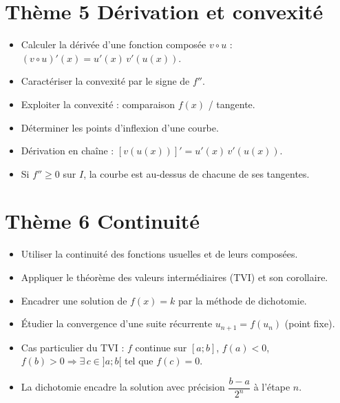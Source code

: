 \documentclass[11pt,a4paper,openany]{book}
\theoremstyle{definition}
\begin{document}
    \section*{Thème 5 \textemdash{} Dérivation et convexité}
    \begin{capacitesbox}
    \begin{itemize}
        \item Calculer la dérivée d'une fonction composée $v\circ u$ :
              $(v\circ u)'(x)=u'(x)\,v'(u(x))$.
        \item Caractériser la convexité par le signe de $f''$.
        \item Exploiter la convexité : comparaison $f(x)$ / tangente.
        \item Déterminer les points d'inflexion d'une courbe.
    \end{itemize}
    \end{capacitesbox}
    \begin{demoprogbox}
    \begin{itemize}
        \item Dérivation en chaîne : $[v(u(x))]'=u'(x)\,v'(u(x))$.
        \item Si $f''\geq 0$ sur $I$, la courbe est au-dessus de chacune de
              ses tangentes.
    \end{itemize}
    \end{demoprogbox}

    \section*{Thème 6 \textemdash{} Continuité}
    \begin{capacitesbox}
    \begin{itemize}
        \item Utiliser la continuité des fonctions usuelles et de leurs
              composées.
        \item Appliquer le théorème des valeurs intermédiaires (TVI) et son
              corollaire.
        \item Encadrer une solution de $f(x)=k$ par la méthode de dichotomie.
        \item Étudier la convergence d'une suite récurrente $u_{n+1}=f(u_n)$
              (point fixe).
    \end{itemize}
    \end{capacitesbox}
    \begin{demoprogbox}
    \begin{itemize}
        \item Cas particulier du TVI : $f$ continue sur $[a;b]$, $f(a)<0$,
              $f(b)>0 \Rightarrow \exists\, c\in{]a;b[}$ tel que $f(c)=0$.
        \item La dichotomie encadre la solution avec précision
              $\dfrac{b-a}{2^n}$ à l'étape $n$.
    \end{itemize}
    \end{demoprogbox}
\end{document}

